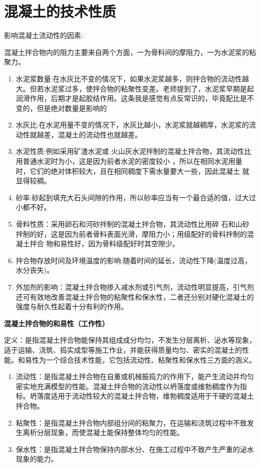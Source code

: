 \documentclass[12pt, a4paper, oneside, UTF8]{ctexbook}
\begin{document}
\section{混凝土的技术性质}

\begin{definition}
    影响混凝土流动性的因素:

    混凝土拌合物内的阻力主要来自两个方面，一为骨料间的摩阻力，一为水泥浆的粘聚力。

    \begin{enumerate}
        \item 水泥浆数量:在水灰比不变的情况下，如果水泥浆越多，则拌合物的流动性越大。但若水泥浆过多，使拌合物的粘聚性变差。老师提到了，水泥浆早期是起润滑作用，后期才是起胶结作用。{\color{red}这条我是感觉有点反常识的，毕竟配比是不变的，但是绝对数量是影响的}
        \item 水灰比:在水泥用量不变的情况下，水灰比越小，水泥浆就越稠厚，水泥浆的流动性就越差，混凝土的流动性也就越差。
        \item 水泥性质:例如采用矿渣水泥或
        火山灰水泥拌制的混凝土拌合物，其流动性比用普通水泥时为小，这是因为前者水泥的密度较小
        ，所以在相同水泥用量时，它们的绝对体积较大，且在相同稠度下需水量要大一些，因此混凝土
        就显得较稠。
        \item 砂率:砂起到填充大石头间隙的作用，{\color{red}所以砂率应当有一个最合适的值}，过大过小都不好。
        \item 骨料性质：采用卵石和河砂拌制的混凝土拌合物，其流动性比用碎
        石和山砂拌制的好，这是因为前者骨料表面光滑，摩阻力小；用级配好的骨料拌制的混凝土拌合
        物和易性好，因为骨料级配好时其空隙少。
        \item 拌合物存放时间及环境温度的影响:随着时间的延长，流动性下降(温度过高，水分丧失)。
        \item 外加剂的影响：混凝土拌合物掺入减水剂或引气剂，流动性明显提高，引气剂还可有效地改善混凝土拌合物的粘聚性和保水性，二者还分别对硬化混凝土的强度与耐久性起着十分有利的作用。
    \end{enumerate}
\end{definition}

\textbf{混凝土拌合物的和易性（工作性）}

定义：是指混凝土拌合物能保持其组成成分均匀，不发生分层离析、泌水等现象，适于运输、浇筑、捣实成型等施工作业，并能获得质量均匀、密实的混凝土的性能。和易性为一个综合技术性能，它包括流动性、粘聚性和保水性三方面的涵义。
\begin{enumerate}
    \item 流动性：是指混凝土拌合物在自重或机械振捣力的作用下，能产生{\color{red}流动并均匀密实地充满模型的性能}。混凝土拌合物的流动性以坍落度或维勃稠度作为指标。坍落度适用于流动性较大的混凝土拌合物，维勃稠度适用于干硬的混凝土拌合物。
    \item 粘聚性：是指混凝土拌合物{\color{red}内部组分间的粘聚力}，在运输和浇筑过程中不致发生离析分层现象，而使混凝土能保持整体均匀的性能。
    \item 保水性：是指混凝土拌合物{\color{red}保持内部水分}、在施工过程中不致产生严重的泌水现象的能力。
\end{enumerate}
\end{document}
